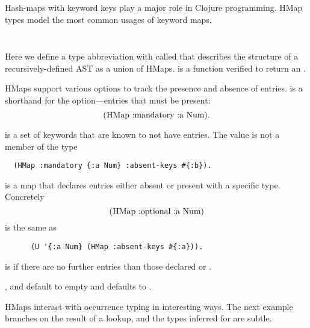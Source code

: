 Hash-maps with keyword keys play a major role in Clojure programming.
HMap types model the most common usages of keyword maps.

\begin{exmp}
\begin{listing}
\inputminted[firstline=5,lastline=8]{clojure}{code/demo/src/demo/hmap.clj}
\inputminted[firstline=26,lastline=28]{clojure}{code/demo/src/demo/hmap.clj}
\end{listing}
\end{exmp}

Here we define a type abbreviation with  called 
that describes the structure of a recursively-defined AST as a union of HMaps.
 is a function verified to return an .

HMaps support various options to track the presence and absence of entries.
 is a shorthand for the  option---entries that
must be present:
$$
\clj{(HMap :mandatory {:a Num})}.
$$

 is a set of keywords that are known to not have entries.
The value  is not a member of the type
\smallskip
\begin{verbatim}
  (HMap :mandatory {:a Num} :absent-keys #{:b}).
\end{verbatim}

 is a map that declares entries either absent or
present with a specific type. Concretely
$$
\clj{(HMap :optional {:a Num})}
$$
is the same as
\begin{verbatim}
      (U '{:a Num} (HMap :absent-keys #{:a})).
\end{verbatim}


 is  if there are no further entries
than those declared  or .

,  and  default to empty
and  defaults to .

HMaps interact with occurrence typing in interesting ways.
The next example branches on the result of a lookup, and the types
inferred for  are subtle.

\begin{exmp}
\begin{listing}
\inputminted[firstline=5,lastline=9]{racket}{code/demo/src/demo/hmap_path.clj}
\end{listing}
\end{exmp}

